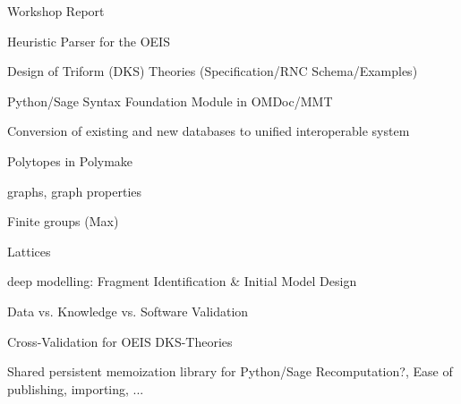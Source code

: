 \begin{workpackage}[id=dksbases,wphases=1-48!.5,
  title=Data/Knowledge/Software-Bases,lead=JU,
  ZHRM=12,JURM=36,USHRM=12,UWRM=3,SARM=10]
\begin{wpdelivs}
  \begin{wpdeliv}[due=9,id=wsrep,dissem=PU,nature=R,lead=JU]{Workshop Report}
  \end{wpdeliv}
  \begin{wpdeliv}[due=9,id=oeisparser,dissem=PU,nature=O,lead=JU]
      {Heuristic Parser for the OEIS}
  \end{wpdeliv}
  \begin{wpdeliv}[due=12,id=dkstheories,dissem=PU,nature=R,lead=JU]
        {Design of Triform (DKS) Theories (Specification/RNC Schema/Examples)}
  \end{wpdeliv}
  \begin{wpdeliv}[due=12,id=pssyntax,dissem=PU,nature=DEC,lead=JU]
        {Python/Sage Syntax Foundation Module in OMDoc/MMT}
  \end{wpdeliv}
  \begin{wpdeliv}[due=12,id=conv,dissem=PU,nature=DEC,lead=ZH]
        {Conversion of existing and new databases to unified interoperable system}
     \begin{compactitem}
     \item Polytopes in Polymake
     \item graphs, graph properties
     \item Finite groups (Max)
     \item Lattices
     \end{compactitem}
   \end{wpdeliv}
  \begin{wpdeliv}[due=12,id=lfmmod,dissem=PU,nature=R,lead=ZH]
      {\LMFDB deep modelling: Fragment Identification \& Initial Model Design}
  \end{wpdeliv}
  \begin{wpdeliv}[due=18,id=lfmval,dissem=PU,nature=R,lead=ZH]
      {\LMFDB Data vs. Knowledge vs. Software Validation}
  \end{wpdeliv}
  \begin{wpdeliv}[due=18,id=oeisvalidation,dissem=PU,nature=R,lead=JU]
      {Cross-Validation for OEIS DKS-Theories}
  \end{wpdeliv}
  \begin{wpdeliv}[due=24,id=persistent-memoization,dissem=PU,nature=O,lead=ZH]
    {Shared persistent memoization library for Python/Sage} 
    Recomputation?,  Ease of publishing, importing, ...
  \end{wpdeliv}
  \begin{wpdeliv}[due=24,id=dksimp,dissem=PU,nature=O,lead=JU]

\end{wpdeliv}
\end{wpdelivs}
\end{workpackage}
